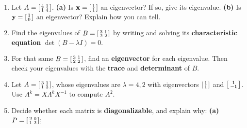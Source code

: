 \documentclass[10pt]{article}
\newcommand{\xx}{\mathbf{x}}
\newcommand{\yy}{\mathbf{y}}
\begin{document}
\begin{enumerate}[leftmargin=1.9em, itemsep=12pt]
  \item Let $A=\begin{bsmallmatrix}4&1\\1&4\end{bsmallmatrix}$.
        \textbf{(a)} Is $\xx=\begin{bsmallmatrix}1\\1\end{bsmallmatrix}$ an eigenvector? If so, give its eigenvalue.
        \textbf{(b)} Is $\yy=\begin{bsmallmatrix}1\\0\end{bsmallmatrix}$ an eigenvector? Explain how you can tell.
        \vspace{2.2cm}
  \item Find the eigenvalues of $B=\begin{bsmallmatrix}3&1\\2&2\end{bsmallmatrix}$ by writing and solving its
        \textbf{characteristic equation} $\det(B-\lambda I)=0$.
        \vspace{2.6cm}
  \item For that same $B=\begin{bsmallmatrix}3&1\\2&2\end{bsmallmatrix}$, find an \textbf{eigenvector} for each
        eigenvalue. Then check your eigenvalues with the \textbf{trace} and \textbf{determinant} of $B$.
        \vspace{3.0cm}
  \item Let $A=\begin{bsmallmatrix}3&1\\1&3\end{bsmallmatrix}$, whose eigenvalues are $\lambda=4,2$ with
        eigenvectors $\begin{bsmallmatrix}1\\1\end{bsmallmatrix}$ and $\begin{bsmallmatrix}1\\-1\end{bsmallmatrix}$.
        Use $A^k=X\Lambda^k X^{-1}$ to compute $A^2$.
        \vspace{3.0cm}
  \item Decide whether each matrix is \textbf{diagonalizable}, and explain why:
        \textbf{(a)} $P=\begin{bsmallmatrix}2&0\\1&2\end{bsmallmatrix}$; \quad

\end{enumerate}
\end{document}
